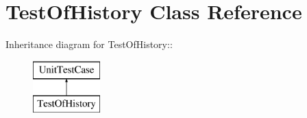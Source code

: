 \hypertarget{class_test_of_history}{
\section{TestOfHistory Class Reference}
\label{class_test_of_history}
}
Inheritance diagram for TestOfHistory::\begin{figure}[H]
\begin{center}
\leavevmode
\includegraphics[height=2cm]{class_test_of_history}
\end{center}
\end{figure}
